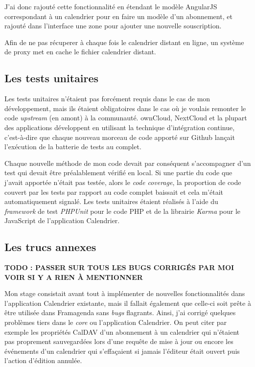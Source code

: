 \documentclass[10pt,a4paper, twoside]{report}
\begin{document}
	J'ai donc rajouté cette fonctionnalité en étendant le modèle AngularJS correspondant à un calendrier pour en faire un modèle d'un abonnement, et rajouté dans l'interface une zone pour ajouter une nouvelle souscription. 
	
	Afin de ne pas récuperer à chaque fois le calendrier distant en ligne, un système de proxy met en cache le fichier calendrier distant.
	
	\subsection{Les tests unitaires}
	Les tests unitaires n'étaient pas forcément requis dans le cas de mon développement, mais ils étaient obligatoires dans le cas où je voulais remonter le code \textit{upstream} (en amont) à la communauté. ownCloud, NextCloud et la plupart des applications développent en utilisant la technique d'intégration continue, c'est-à-dire que chaque nouveau morceau de code apporté sur Github lançait l'exécution de la batterie de tests au complet. 
	
	Chaque nouvelle méthode de mon code devait par conséquent s'accompagner d'un test qui devait être préalablement vérifié en local. Si une partie du code que j'avait apportée n'était pas testée, alors le \textit{code coverage}, la proportion de code couvert par les tests par rapport au code complet baissait et cela m'était automatiquement signalé. Les tests unitaires étaient réalisés à l'aide du \textit{framework} de test \textit{PHPUnit} pour le code PHP et de la librairie \textit{Karma} pour le JavaScript de l'application Calendrier.
	
	\subsection{Les trucs annexes}
	
	\textbf{\color{red}TODO : PASSER SUR TOUS LES BUGS CORRIGÉS PAR MOI VOIR SI Y A RIEN À MENTIONNER}
	
	Mon stage consistait avant tout à implémenter de nouvelles fonctionnalités dans l'application Calendrier existante, mais il fallait également que celle-ci soit prête à être utilisée dans Framagenda sans \textit{bugs} flagrants. Ainsi, j'ai corrigé quelques problèmes tiers dans le \textit{core} ou l'application Calendrier.
	On peut citer par exemple les propriétés CalDAV d'un abonnement à un calendrier qui n'étaient pas proprement sauvegardées lors d'une requête de mise à jour ou encore les événements d'un calendrier qui s'effaçaient si jamais l'éditeur était ouvert puis l'action d'édition annulée. 
	
\end{document}
